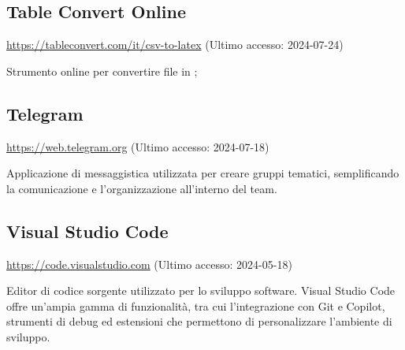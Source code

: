 \subsection{Table Convert Online}
\par \href{https://tableconvert.com/it/csv-to-latex}{https://tableconvert.com/it/csv-to-latex} (Ultimo accesso: 2024-07-24)
\par Strumento online per convertire file  in ;

\subsection{Telegram}
\par \href{https://web.telegram.org}{https://web.telegram.org} (Ultimo accesso: 2024-07-18)
\par Applicazione di messaggistica utilizzata per creare gruppi tematici, semplificando la comunicazione e l'organizzazione all'interno del team.
    
\subsection{Visual Studio Code}
\par \href{https://code.visualstudio.com}{https://code.visualstudio.com} (Ultimo accesso: 2024-05-18)
\par Editor di codice sorgente utilizzato per lo sviluppo software. Visual Studio Code offre un’ampia gamma di funzionalità, tra cui l'integrazione con Git e Copilot, strumenti di debug ed estensioni che permettono di personalizzare l’ambiente di sviluppo.
